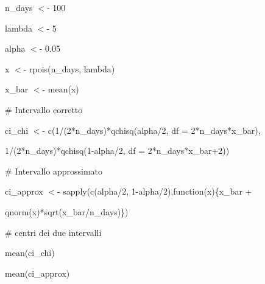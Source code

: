 \documentclass[a4paper,portrait,12pt]{article}
\begin{document}
\begin{flushleft}
n\_days $<$- 100
\end{flushleft}


\begin{flushleft}
lambda $<$- 5
\end{flushleft}


\begin{flushleft}
alpha $<$- 0.05
\end{flushleft}


\begin{flushleft}
x $<$- rpois(n\_days, lambda)
\end{flushleft}


\begin{flushleft}
x\_bar $<$- mean(x)
\end{flushleft}


\begin{flushleft}
\# Intervallo corretto
\end{flushleft}


\begin{flushleft}
ci\_chi $<$- c(1/(2*n\_days)*qchisq(alpha/2, df = 2*n\_days*x\_bar),
\end{flushleft}


\begin{flushleft}
1/(2*n\_days)*qchisq(1-alpha/2, df = 2*n\_days*x\_bar+2))
\end{flushleft}


\begin{flushleft}
\# Intervallo approssimato
\end{flushleft}


\begin{flushleft}
ci\_approx $<$- sapply(c(alpha/2, 1-alpha/2),function(x)\{x\_bar +
\end{flushleft}


\begin{flushleft}
qnorm(x)*sqrt(x\_bar/n\_days)\})
\end{flushleft}


\begin{flushleft}
\# centri dei due intervalli
\end{flushleft}


\begin{flushleft}
mean(ci\_chi)
\end{flushleft}


\begin{flushleft}
mean(ci\_approx)
\end{flushleft}
\end{document}
